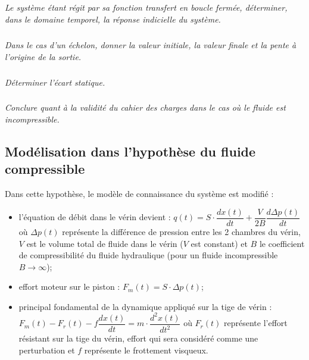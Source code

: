 \documentclass[11pt,oneside]{article}
\begin{document}
\subparagraph{}
\textit{Le système étant régit par sa fonction transfert en boucle fermée, déterminer, dans le domaine temporel, la réponse indicielle du système.}


\subparagraph{}
\textit{Dans le cas d'un échelon, donner la valeur initiale, la valeur finale et la pente à l'origine de la sortie.}

\subparagraph{}
\textit{Déterminer l'écart statique.}

\subparagraph{}
\textit{Conclure quant à la validité du cahier des charges dans le cas où le fluide est incompressible.}


\subsection*{Modélisation dans l'hypothèse du fluide compressible}
Dans cette hypothèse, le modèle de connaissance du système est modifié : 
\begin{itemize}
\item l'équation de débit dans le vérin devient : $q(t)=S\cdot\dfrac{dx(t)}{dt}+\dfrac{V}{2B}\dfrac{d\Delta p(t)}{dt}$ où $\Delta p(t)$ représente la différence de pression entre les 2 chambres du vérin, $V$ est le volume total de fluide dans le vérin ($V$ est constant) et $B$ le coefficient de compressibilité du fluide hydraulique (pour un fluide incompressible $B\rightarrow \infty$);
\item effort moteur sur le piston : $F_m(t)=S\cdot \Delta p(t)$;
\item principal fondamental de la dynamique appliqué sur la tige de vérin :
$F_m(t)-F_r(t)-f\dfrac{dx(t)}{dt}=m\cdot\dfrac{d^2x(t)}{dt^2}$ où $F_r(t)$ représente l'effort résistant sur la tige du vérin, effort qui sera considéré comme une perturbation et $f$ représente le frottement visqueux.
\end{itemize}
\end{document}
